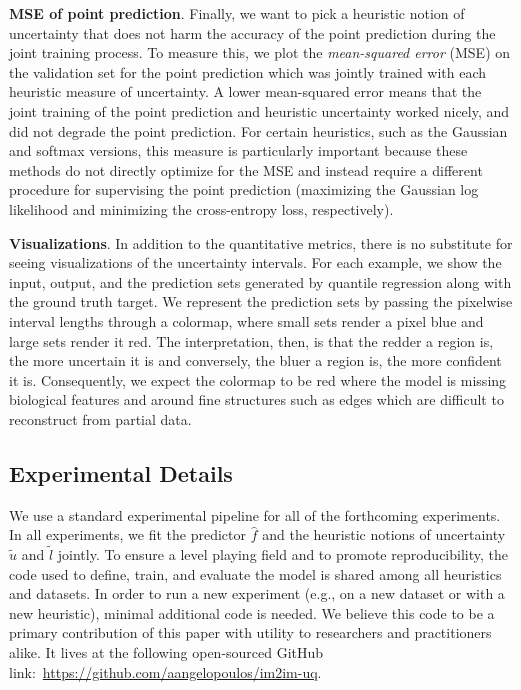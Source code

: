 \documentclass[10pt]{article}
\begin{document}
\noindent \textbf{MSE of point prediction}. Finally, we want to pick a heuristic notion of uncertainty that does not harm the accuracy of the point prediction during the joint training process.
To measure this, we plot the \emph{mean-squared error} (MSE) on the validation set for the point prediction which was jointly trained with each heuristic measure of uncertainty.
A lower mean-squared error means that the joint training of the point prediction and heuristic uncertainty worked nicely, and did not degrade the point prediction.
For certain heuristics, such as the Gaussian and softmax versions, this measure is particularly important because these methods do not directly optimize for the MSE and instead require a different procedure for supervising the point prediction (maximizing the Gaussian log likelihood and minimizing the cross-entropy loss, respectively).

\noindent \textbf{Visualizations}. In addition to the quantitative metrics, there is no substitute for seeing visualizations of the uncertainty intervals.
For each example, we show the input, output, and the prediction sets generated by quantile regression along with the ground truth target.
We represent the prediction sets by passing the pixelwise interval lengths through a colormap, where small sets render a pixel blue and large sets render it red. The interpretation, then, is that the redder a region is, the more uncertain it is and conversely, the bluer a region is, the more confident it is.
Consequently, we expect the colormap to be red where the model is missing biological features and around fine structures such as edges which are difficult to reconstruct from partial data.

\subsection{Experimental Details}
We use a standard experimental pipeline for all of the forthcoming experiments.
In all experiments, we fit the predictor $\hat{f}$ and the heuristic notions of uncertainty $\tilde{u}$ and $\tilde{l}$ jointly.
To ensure a level playing field and to promote reproducibility, the code used to define, train, and evaluate the model is shared among all heuristics and datasets.
In order to run a new experiment (e.g., on a new dataset or with a new heuristic), minimal additional code is needed.
We believe this code to be a primary contribution of this paper with utility to researchers and practitioners alike.
It lives at the following open-sourced GitHub link:~\textcolor{blue}{\url{https://github.com/aangelopoulos/im2im-uq}}.
\end{document}
